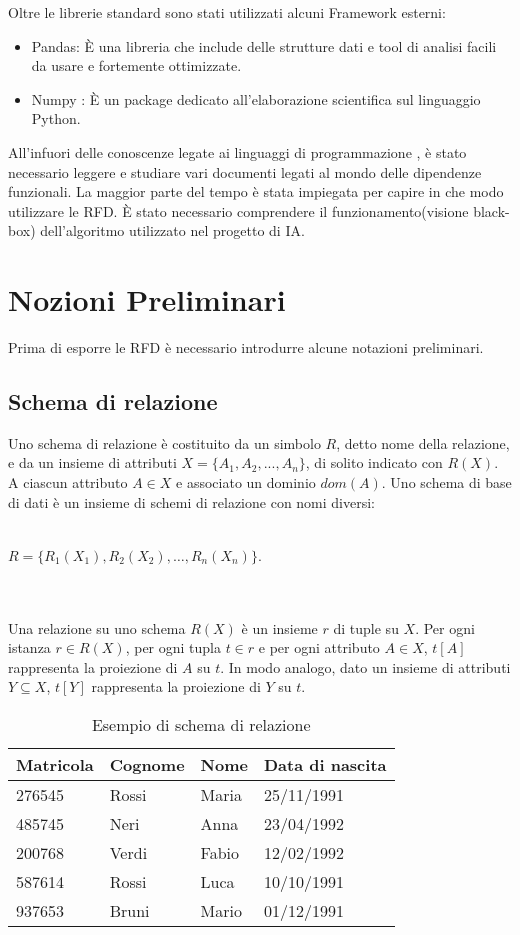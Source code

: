 Oltre le librerie standard sono stati utilizzati alcuni Framework esterni: 
\begin{itemize}
\item Pandas: È una libreria che include delle strutture dati e tool di analisi facili da usare e fortemente ottimizzate. 
\item Numpy : È un package dedicato all'elaborazione scientifica sul linguaggio Python.
\end{itemize}
All'infuori delle conoscenze legate ai linguaggi di programmazione , è stato necessario leggere e studiare vari documenti legati al mondo delle dipendenze funzionali. La maggior parte del tempo è stata impiegata per capire in che modo utilizzare le RFD. 
È stato necessario comprendere il funzionamento(visione black-box) dell’algoritmo utilizzato nel progetto di IA. 

\section{Nozioni Preliminari}
Prima di esporre le RFD è necessario introdurre alcune notazioni preliminari.

\subsection{Schema di relazione}
Uno schema di relazione è costituito da un simbolo $R$, detto nome della relazione, e da un insieme di attributi $X = \{A_1,A_2,...,A_n\}$, di solito indicato
con $R(X)$. A ciascun attributo $A \in X$ e associato un dominio $dom(A)$.
Uno schema di base di dati è un insieme di schemi di relazione con nomi
diversi:
\\~\\
\centerline{$R = \{ R_1(X_1),R_2(X_2),\ldots,R_n(X_n)\}$.}
\\~\\
Una relazione su uno schema $R(X)$ è un insieme $r$ di tuple su $X$. Per
ogni istanza $r \in R(X)$, per ogni tupla $t \in r$ e per ogni attributo $A \in X$,
$t[A]$ rappresenta la proiezione di $A$ su $t$. In modo analogo, dato un insieme
di attributi $Y \subseteq X$, $t[Y]$ rappresenta la proiezione di $Y$ su $t$.\cite{libroCeri}


\begin{table}[H]
    \centering
    \begin{tabular}{ | l | l | l | l |}
        \hline
        Matricola & Cognome & Nome & Data di nascita\\
        \hline
        276545 & Rossi & Maria & 25/11/1991 \\ 
        485745 & Neri & Anna & 23/04/1992 \\ 
        200768 & Verdi & Fabio & 12/02/1992 \\
        587614 & Rossi & Luca & 10/10/1991 \\
        937653 & Bruni & Mario & 01/12/1991 \\
        \hline
    \end{tabular}
    \caption{Esempio di schema di relazione}
    \label{tab:table example}
\end{table}

